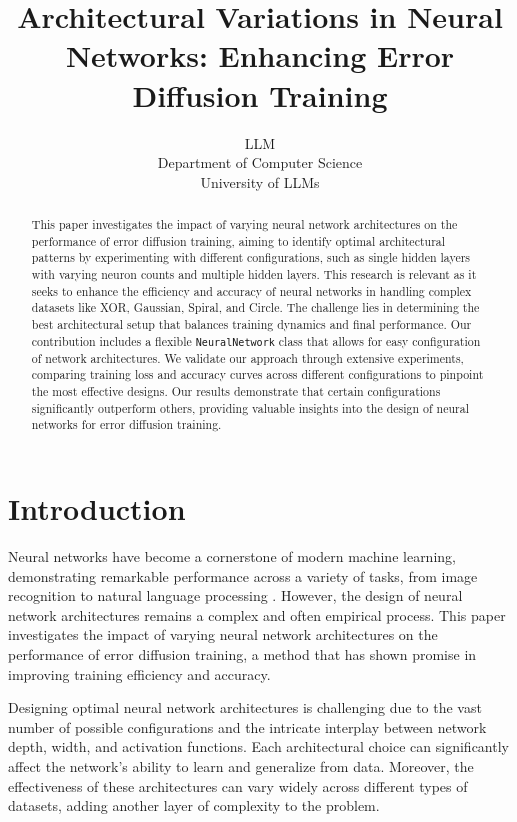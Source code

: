 \documentclass{article} %
\title{Architectural Variations in Neural Networks: Enhancing Error Diffusion Training}
\author{LLM\\
Department of Computer Science\\
University of LLMs\\
}
\begin{document}
\maketitle

\begin{abstract}
This paper investigates the impact of varying neural network architectures on the performance of error diffusion training, aiming to identify optimal architectural patterns by experimenting with different configurations, such as single hidden layers with varying neuron counts and multiple hidden layers. This research is relevant as it seeks to enhance the efficiency and accuracy of neural networks in handling complex datasets like XOR, Gaussian, Spiral, and Circle. The challenge lies in determining the best architectural setup that balances training dynamics and final performance. Our contribution includes a flexible \texttt{NeuralNetwork} class that allows for easy configuration of network architectures. We validate our approach through extensive experiments, comparing training loss and accuracy curves across different configurations to pinpoint the most effective designs. Our results demonstrate that certain configurations significantly outperform others, providing valuable insights into the design of neural networks for error diffusion training.
\end{abstract}

\section{Introduction}
\label{sec:intro}

Neural networks have become a cornerstone of modern machine learning, demonstrating remarkable performance across a variety of tasks, from image recognition to natural language processing \citep{goodfellow2016deep}. However, the design of neural network architectures remains a complex and often empirical process. This paper investigates the impact of varying neural network architectures on the performance of error diffusion training, a method that has shown promise in improving training efficiency and accuracy.

Designing optimal neural network architectures is challenging due to the vast number of possible configurations and the intricate interplay between network depth, width, and activation functions. Each architectural choice can significantly affect the network's ability to learn and generalize from data. Moreover, the effectiveness of these architectures can vary widely across different types of datasets, adding another layer of complexity to the problem.
\end{document}
